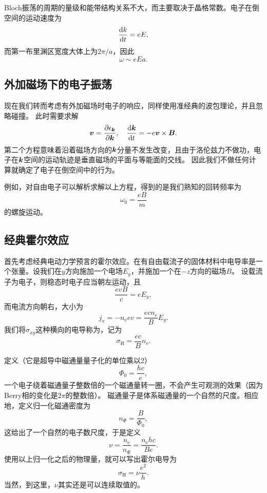 Bloch振荡的周期的量级和能带结构关系不大，而主要取决于晶格常数。电子在倒空间的运动速度为
\[
    \dv{k}{t} = e E,
\]
而第一布里渊区宽度大体上为$2 \pi / a$，因此
\begin{equation}
    \omega \sim e E a.
\end{equation}

\subsection{外加磁场下的电子振荡}

现在我们转而考虑有外加磁场时电子的响应，同样使用准经典的波包理论，并且忽略碰撞。
此时需要求解
\begin{equation}
    \vb*{v} = \pdv{\epsilon_{\vb*{k}}}{\vb*{k}}, \quad \dv{\vb*{k}}{t} = -e \vb*{v} \times \vb*{B}.
    \label{eq:calssical-magnetic-field}
\end{equation}
第二个方程意味着沿着磁场方向的$\vb*{k}$分量不发生改变，且由于洛伦兹力不做功，电子在$\vb*{k}$空间的运动轨迹是垂直磁场的平面与等能面的交线。
因此我们不做任何计算就确定了电子在倒空间中的行为。

例如，对自由电子可以解析求解以上方程，得到的是我们熟知的回转频率为
\begin{equation}
    \omega_0 = \frac{e B}{m}
\end{equation}
的螺旋运动。

\subsection{经典霍尔效应}\label{sec:classical-hall-effect}

首先考虑经典电动力学预言的霍尔效应。在有自由载流子的固体材料中电导率是一个张量。设我们在$y$方向施加一个电场$E_y$，并施加一个在$-z$方向的磁场$B$。
设载流子为电子，则稳态时电子应当朝左运动，且
\[
    \frac{e v B}{c} = e E_y,
\]
而电流方向朝右，大小为
\[
    j_x = - n_\text{e} e v = \frac{e c n_\text{e}}{B} E_y.
\]
我们将$\sigma_{xy}$这种横向的电导称为，记为
\begin{equation}
    \sigma_\text{H} = \frac{ec}{B} n_\text{e}.
\end{equation}

定义（它是超导中磁通量量子化的单位乘以2）
\begin{equation}
    \Phi_0 = \frac{h c}{e},
\end{equation}
一个电子绕着磁通量子整数倍的一个磁通量转一圈，不会产生可观测的效果（因为Berry相的变化是$2\pi$的整数倍）。
磁通量子是体系磁通量的一个自然的尺度。相应地，定义归一化磁通密度为
\begin{equation}
    n_{\Phi} = \frac{B}{\Phi_0},
\end{equation}
这给出了一个自然的电子数尺度，于是定义
\begin{equation}
    \nu = \frac{n_\text{e}}{n_\Phi} = \frac{n_\text{e} h c}{B e}.
\end{equation}
使用以上归一化之后的物理量，就可以写出霍尔电导为
\begin{equation}
    \sigma_\text{H} = \nu \frac{e^2}{h}.
\end{equation}
当然，到这里，$\nu$其实还是可以连续取值的。

